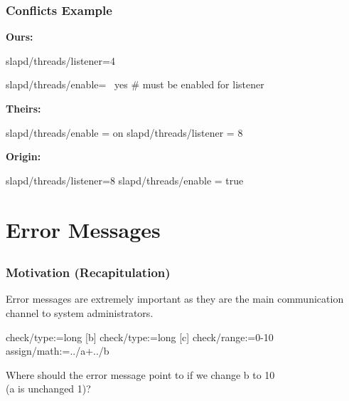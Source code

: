 \begin{frame}[fragile]
	\frametitle{Conflicts Example}

	\textbf{Ours:}
	\begin{code}[gobble=4,language=CfgElektra]
	slapd/threads/listener=4

	slapd/threads/enable= \
		yes # must be enabled for listener

	\end{code}

	\textbf{Theirs:}
	\begin{code}[gobble=4,language=CfgElektra]
	slapd/threads/enable = on
	slapd/threads/listener = 8
	\end{code}

	\pause
	\textbf{Origin:}
	\begin{code}[gobble=4,language=CfgElektra]
	slapd/threads/listener=8
	slapd/threads/enable = true
	\end{code}
\end{frame}






\section{Error Messages}

\subsection{}

\begin{frame}[fragile]
	\frametitle{Motivation (Recapitulation)}

	Error messages are extremely important as they are the main communication channel to system administrators.\\
	\vspace{0.5em}

	\begin{code}[morekeywords={assign,math},gobble=4]
	[a]
	  check/type:=long
	[b]
	  check/type:=long
	[c]
	  check/range:=0-10
	  assign/math:=../a+../b
	\end{code}

	\begin{task}
	Where should the error message point to if we change b to 10 \\ (a is unchanged 1)?
	\end{task}
\end{frame}

